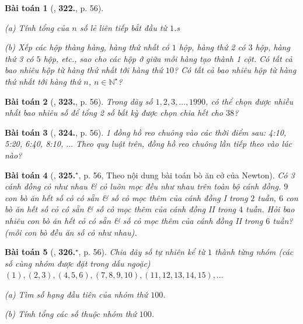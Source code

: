 \documentclass{article}
\numberwithin{equation}{section}
\newtheorem{baitoan}{Bài toán}
\begin{document}
\begin{baitoan}[\cite{Binh_Toan_6_tap_1}, \textbf{322.}, p. 56]
	\begin{enumerate*}
		\item[(a)] Tính tổng của $n$ số lẻ liên tiếp bắt đầu từ $1$.s
		\item[(b)] Xếp các hộp thàng hàng, hàng thứ nhất có $1$ hộp, hàng thứ 2 có $3$ hộp, hàng thứ 3 có $5$ hộp, etc., sao cho các hộp ở giữa mỗi hàng tạo thành 1 cột. Có tất cả bao nhiêu hộp từ hàng thứ nhất tới hàng thứ $10$? Có tất cả bao nhiêu  hộp từ hàng thứ nhất tới hàng thứ $n$, $n\in\mathbb{N}^\star$?
	\end{enumerate*}
\end{baitoan}

\begin{baitoan}[\cite{Binh_Toan_6_tap_1}, \textbf{323.}, p. 56]
	Trong dãy số $1,2,3,\ldots,1990$, có thể chọn được nhiều nhất bao nhiêu số để tổng 2 số bất kỳ được chọn chia hết cho $38$?
\end{baitoan}

\begin{baitoan}[\cite{Binh_Toan_6_tap_1}, \textbf{324.}, p. 56]
	1 đồng hồ reo chuông vào các thời điểm sau: 4:10, 5:20, 6:40, 8:10, $\ldots$ Theo quy luật trên, đồng hồ reo chuông lần tiếp theo vào lúc nào?
\end{baitoan}

\begin{baitoan}[\cite{Binh_Toan_6_tap_1}, \textbf{325.}${}^\star$, p. 56, Theo nội dung bài toán bò ăn cở của Newton]
	Có 3 cánh đồng cỏ như nhau \& cỏ luôn mọc đều như nhau trên toàn bộ cánh đồng. $9$ con bò ăn hết số cỏ có sẵn \& số cỏ mọc thêm của cánh đồng I trong $2$ tuần, $6$ con bò ăn hết số cỏ có sẵn \& số cỏ mọc thêm của cánh đồng II trong $4$ tuần. Hỏi bao nhiêu con bò ăn hết cỏ có sẵn \& số cỏ mọc thêm của cánh đồng II trong $6$ tuần? (mỗi con bò đều ăn số cỏ như nhau).
\end{baitoan}

\begin{baitoan}[\cite{Binh_Toan_6_tap_1}, \textbf{326.}${}^\star$, p. 56]
	Chia dãy số tự nhiên kể từ $1$ thành từng nhóm (các số cùng nhóm được đặt trong dấu ngoặc) $(1),(2,3),(4,5,6),(7,8,9,10),(11,12,13,14,15),\ldots$
	\begin{enumerate*}
		\item[(a)] Tìm số hạng đầu tiên của nhóm thứ $100$.
		\item[(b)] Tính tổng các số thuộc nhóm thứ $100$.
	\end{enumerate*}
\end{baitoan}
\end{document}
